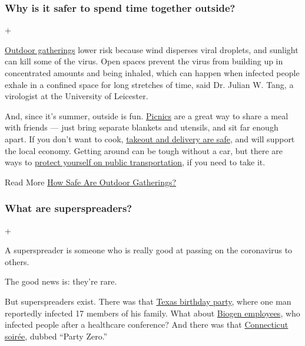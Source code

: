 \hypertarget{why-is-it-safer-to-spend-time-together-outside}{%
\subsubsection{Why is it safer to spend time together
outside?}\label{why-is-it-safer-to-spend-time-together-outside}}

+

\href{https://www.nytimes.com/2020/05/15/us/coronavirus-what-to-do-outside.html}{Outdoor
gatherings} lower risk because wind disperses viral droplets, and
sunlight can kill some of the virus. Open spaces prevent the virus from
building up in concentrated amounts and being inhaled, which can happen
when infected people exhale in a confined space for long stretches of
time, said Dr. Julian W. Tang, a virologist at the University of
Leicester.

And, since it's summer, outside is fun.
\href{https://www.nytimes.com/2020/05/09/dining/coronavirus-how-to-have-a-picnic-safely.html}{Picnics}
are a great way to share a meal with friends --- just bring separate
blankets and utensils, and sit far enough apart. If you don't want to
cook,
\href{https://www.nytimes.com/2020/05/27/dining/takeout-delivery-safety-coronavirus.html}{takeout
and delivery are safe}, and will support the local economy. Getting
around can be tough without a car, but there are ways to
\href{https://www.nytimes.com/2020/06/08/nyregion/mta-subway-riding-health-coronavirus.html}{protect
yourself on public transportation}, if you need to take it.

 Read More
\href{https://www.nytimes.com/2020/07/03/well/live/coronavirus-spread-outdoors-party.html}{How
Safe Are Outdoor Gatherings?}

\hypertarget{what-are-superspreaders}{%
\subsubsection{What are superspreaders?}\label{what-are-superspreaders}}

+

A superspreader is someone who is really good at passing on the
coronavirus to others.

The good news is: they're rare.

But superspreaders exist. There was that
\href{https://apnews.com/d9a6ca7eef083315648003509d07515a}{Texas
birthday party}, where one man reportedly infected 17 members of his
family. What about
\href{https://www.nytimes.com/2020/04/12/us/coronavirus-biogen-boston-superspreader.html}{Biogen
employees}, who infected people after a healthcare conference? And there
was that
\href{https://www.nytimes.com/2020/03/23/us/coronavirus-westport-connecticut-party-zero.html}{Connecticut
soirée}, dubbed ``Party Zero.''

